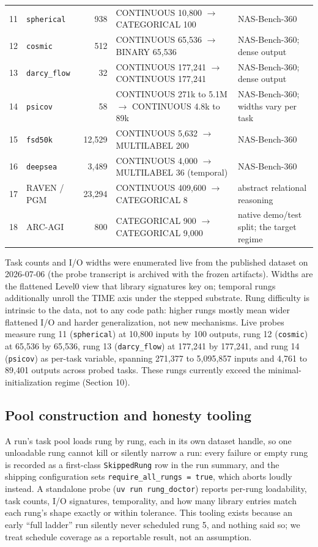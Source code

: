 \documentclass[11pt]{article}
\begin{document}
\begin{table}[htbp]
\begin{tabularx}{\textwidth}{@{}c l r L L@{}}
11 & \texttt{spherical} & 938 & CONTINUOUS 10,800 $\to$ CATEGORICAL 100 & NAS-Bench-360 \\
12 & \texttt{cosmic} & 512 & CONTINUOUS 65,536 $\to$ BINARY 65,536 & NAS-Bench-360; dense output \\
13 & \texttt{darcy_flow} & 32 & CONTINUOUS 177,241 $\to$ CONTINUOUS 177,241 & NAS-Bench-360; dense output \\
14 & \texttt{psicov} & 58 & CONTINUOUS 271k to 5.1M $\to$ CONTINUOUS 4.8k to 89k & NAS-Bench-360; widths vary per task \\
15 & \texttt{fsd50k} & 12,529 & CONTINUOUS 5,632 $\to$ MULTILABEL 200 & NAS-Bench-360 \\
16 & \texttt{deepsea} & 3,489 & CONTINUOUS 4,000 $\to$ MULTILABEL 36 (temporal) & NAS-Bench-360 \\
17 & RAVEN / PGM & 23,294 & CONTINUOUS 409,600 $\to$ CATEGORICAL 8 & abstract relational reasoning \\
18 & ARC-AGI & 800 & CATEGORICAL 900 $\to$ CATEGORICAL 9,000 & native demo/test split; the target regime \\
\bottomrule
\end{tabularx}
\end{table}

Task counts and I/O widths were enumerated live from the published dataset on 2026-07-06 (the probe transcript is archived with the frozen artifacts). Widths are the flattened Level0 view that library signatures key on; temporal rungs additionally unroll the TIME axis under the stepped substrate. Rung difficulty is intrinsic to the data, not to any code path: higher rungs mostly mean wider flattened I/O and harder generalization, not new mechanisms. Live probes measure rung 11 (\texttt{spherical}) at 10,800 inputs by 100 outputs, rung 12 (\texttt{cosmic}) at 65,536 by 65,536, rung 13 (\texttt{darcy_flow}) at 177,241 by 177,241, and rung 14 (\texttt{psicov}) as per-task variable, spanning 271,377 to 5,095,857 inputs and 4,761 to 89,401 outputs across probed tasks. These rungs currently exceed the minimal-initialization regime (Section 10).

\subsection{Pool construction and honesty tooling}

A run's task pool loads rung by rung, each in its own dataset handle, so one unloadable rung cannot kill or silently narrow a run: every failure or empty rung is recorded as a first-class \texttt{SkippedRung} row in the run summary, and the shipping configuration sets \texttt{require_all_rungs = true}, which aborts loudly instead. A standalone probe (\texttt{uv run rung_doctor}) reports per-rung loadability, task counts, I/O signatures, temporality, and how many library entries match each rung's shape exactly or within tolerance. This tooling exists because an early ``full ladder'' run silently never scheduled rung 5, and nothing said so; we treat schedule coverage as a reportable result, not an assumption.
\end{document}
